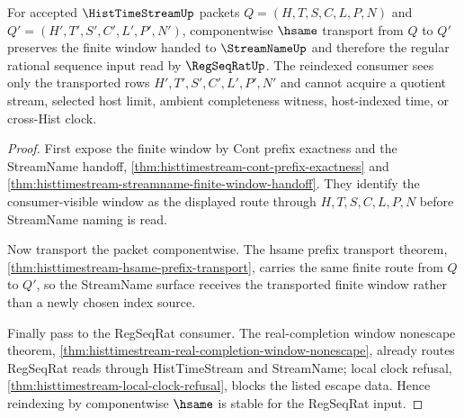 \begin{theorem}
\label{thm:hist-time-stream-regseq-reindex-stability}
For accepted $\HistTimeStreamUp$ packets $Q=(H,T,S,C,L,P,N)$ and $Q'=(H',T',S',C',L',P',N')$, componentwise $\hsame$ transport from $Q$ to $Q'$ preserves the finite window handed to $\StreamNameUp$ and therefore the regular rational sequence input read by $\RegSeqRatUp$. The reindexed consumer sees only the transported rows $H',T',S',C',L',P',N'$ and cannot acquire a quotient stream, selected host limit, ambient completeness witness, host-indexed time, or cross-Hist clock.
\end{theorem}
\begin{proof}
First expose the finite window by Cont prefix exactness and the StreamName handoff, \autoref{thm:histtimestream-cont-prefix-exactness} and \autoref{thm:histtimestream-streamname-finite-window-handoff}. They identify the consumer-visible window as the displayed route through $H,T,S,C,L,P,N$ before StreamName naming is read.

Now transport the packet componentwise. The hsame prefix transport theorem, \autoref{thm:histtimestream-hsame-prefix-transport}, carries the same finite route from $Q$ to $Q'$, so the StreamName surface receives the transported finite window rather than a newly chosen index source.

Finally pass to the RegSeqRat consumer. The real-completion window nonescape theorem, \autoref{thm:histtimestream-real-completion-window-nonescape}, already routes RegSeqRat reads through HistTimeStream and StreamName; local clock refusal, \autoref{thm:histtimestream-local-clock-refusal}, blocks the listed escape data. Hence reindexing by componentwise $\hsame$ is stable for the RegSeqRat input.
\end{proof}

